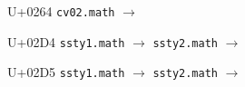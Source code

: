 \documentclass{article}
\begin{document}
\clearpage

\begin{substitutions}

U+0264  \linebreak
    \texttt{cv02.math} $\to$  

\goodbreak

\end{substitutions}

\clearpage

\begin{substitutions}

U+02D4  \linebreak
    \texttt{ssty1.math} $\to$  \linebreak
    \texttt{ssty2.math} $\to$  

\goodbreak

U+02D5  \linebreak
    \texttt{ssty1.math} $\to$  \linebreak
    \texttt{ssty2.math} $\to$  

\goodbreak

\end{substitutions}

\clearpage
\end{document}
